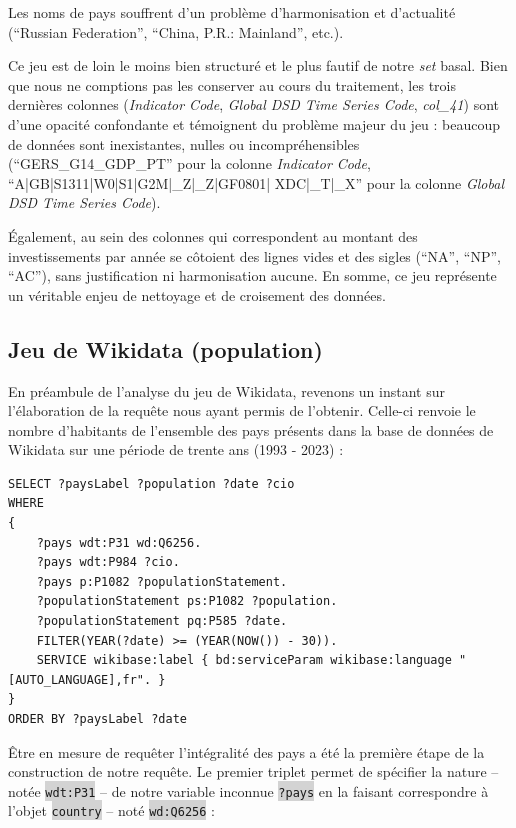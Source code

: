 \documentclass[hidelinks, 12pt]{report}
\newcommand{\code}[1]{\colorbox{LightGray}{\texttt{#1}}}
\begin{document}
Les noms de pays souffrent d'un problème d'harmonisation et d'actualité (\enquote{Russian Federation}, \enquote{China, P.R.: Mainland}, etc.).

Ce jeu est de loin le moins bien structuré et le plus fautif de notre \textit{set} basal. Bien que nous ne comptions pas les conserver au cours du traitement, les trois dernières colonnes (\textit{Indicator Code}, \textit{Global DSD Time Series Code}, \textit{col\_41}) sont d'une opacité confondante et témoignent du problème majeur du jeu : beaucoup de données sont inexistantes, nulles ou incompréhensibles (\enquote{GERS\_G14\_GDP\_PT} pour la colonne \textit{Indicator Code}, \enquote{A|GB|S1311|W0|S1|G2M|\_Z|\_Z|GF0801|
	XDC|\_T|\_X} pour la colonne \textit{Global DSD Time Series Code}).

Également, au sein des colonnes qui correspondent au montant des investissements par année se côtoient des lignes vides et des sigles (\enquote{NA}, \enquote{NP}, \enquote{AC}), sans justification ni harmonisation aucune. En somme, ce jeu représente un véritable enjeu de nettoyage et de croisement des données.





%





\subsection{Jeu de Wikidata (population)}

En préambule de l'analyse du jeu de Wikidata, revenons un instant sur l'élaboration de la requête nous ayant permis de l'obtenir. Celle-ci renvoie le nombre d'habitants de l'ensemble des pays présents dans la base de données de Wikidata sur une période de trente ans (1993 - 2023) :

\label{query1}\begin{lstlisting}[language=SPARQL]
SELECT ?paysLabel ?population ?date ?cio
WHERE 
{
	?pays wdt:P31 wd:Q6256.
	?pays wdt:P984 ?cio.
	?pays p:P1082 ?populationStatement.
	?populationStatement ps:P1082 ?population. 
	?populationStatement pq:P585 ?date.
	FILTER(YEAR(?date) >= (YEAR(NOW()) - 30)).
	SERVICE wikibase:label { bd:serviceParam wikibase:language "[AUTO_LANGUAGE],fr". }
}
ORDER BY ?paysLabel ?date
\end{lstlisting}

Être en mesure de requêter l'intégralité des pays a été la première étape de la construction de notre requête. Le premier triplet permet de spécifier la nature -- notée \code{wdt:P31} -- de notre variable inconnue \code{?pays} en la faisant correspondre à l'objet \code{country} -- noté \code{wd:Q6256} :
\end{document}
